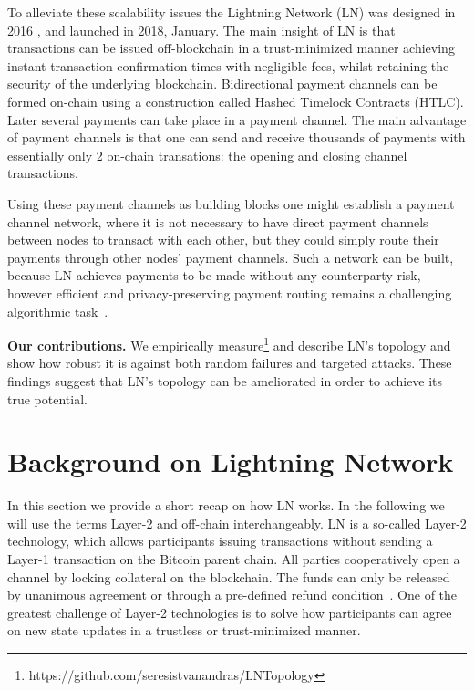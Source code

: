 \documentclass[runningheads]{llncs}
\begin{document}
To alleviate these scalability issues the Lightning Network (LN) was designed in 2016 \cite{poon2016bitcoin}, and launched in 2018, January. The main insight of LN is that transactions can be issued off-blockchain in a trust-minimized manner achieving instant transaction confirmation times with negligible fees, whilst retaining the security of the underlying blockchain. Bidirectional payment channels can be formed on-chain using a construction called Hashed Timelock Contracts (HTLC). Later several payments can take place in a payment channel. The main advantage of payment channels is that one can send and receive thousands of payments with essentially only 2 on-chain transations: the opening and closing channel transactions. 

Using these payment channels as building blocks one might establish a payment channel network, where it is not necessary to have direct payment channels between nodes to transact with each other, but they could simply route their payments through other nodes' payment channels.
Such a network can be built, because LN achieves payments to be made without any counterparty risk, however efficient and privacy-preserving payment routing remains a challenging algorithmic task~\cite{roos2017settling}. 

\textbf{Our contributions.} We empirically measure\footnote{https://github.com/seresistvanandras/LNTopology} and describe LN's topology and show how robust it is against both random failures and targeted attacks. These findings suggest that LN's topology can be ameliorated in order to achieve its true potential.
\section{Background on Lightning Network}
In this section we provide a short recap on how LN works. In the following we will use the terms Layer-2 and off-chain interchangeably. LN is a so-called Layer-2 technology, which allows participants issuing transactions without sending a Layer-1 transaction on the Bitcoin parent chain. All parties cooperatively
open a channel by locking collateral on the blockchain. The funds can only be released by unanimous agreement or through a pre-defined refund condition~\cite{cryptoeprint:2019:360}. One of the greatest challenge of Layer-2 technologies is to solve how participants can agree on new state updates in a trustless or trust-minimized manner.
\end{document}
